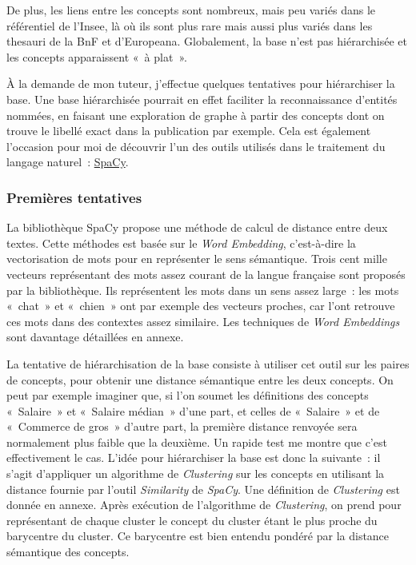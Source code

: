 De plus, les liens entre les concepts sont nombreux, mais peu variés dans le référentiel de l'Insee, là où ils sont plus rare mais aussi plus variés dans les thesauri de la BnF et d'Europeana. Globalement, la base n'est pas hiérarchisée et les concepts apparaissent «~à plat~».
\newline

À la demande de mon tuteur, j'effectue quelques tentatives pour hiérarchiser la base. Une base hiérarchisée pourrait en effet faciliter la reconnaissance d'entités nommées, en faisant une exploration de graphe à partir des concepts dont on trouve le libellé exact dans la publication par exemple. Cela est également l'occasion pour moi de découvrir l'un des outils utilisés dans le traitement du langage naturel~: \href{https://spacy.io/}{SpaCy}.
\label{section 1.2.1}

\subsubsection*{Premières tentatives}
La bibliothèque SpaCy propose une méthode de calcul de distance entre deux textes. Cette méthodes est basée sur le \textit{Word Embedding}, c'est-à-dire la vectorisation de mots pour en représenter le sens sémantique. Trois cent mille vecteurs représentant des mots assez courant de la langue française sont proposés par la bibliothèque. Ils représentent les mots dans un sens assez large~: les mots «~chat~» et «~chien~» ont par exemple des vecteurs proches, car l'ont retrouve ces mots dans des contextes assez similaire. Les techniques de \textit{Word Embeddings} sont davantage détaillées en annexe.
\newline

La tentative de hiérarchisation de la base consiste à utiliser cet outil sur les paires de concepts, pour obtenir une distance sémantique entre les deux concepts. On peut par exemple imaginer que, si l'on soumet les définitions des concepts «~Salaire~» et «~Salaire médian~» d'une part, et celles de «~Salaire~» et de «~Commerce de gros~» d'autre part, la première distance renvoyée sera normalement plus faible que la deuxième. Un rapide test me montre que c'est effectivement le cas. L'idée pour hiérarchiser la base est donc la suivante~: il s'agit d'appliquer un algorithme de \textit{Clustering} sur les concepts en utilisant la distance fournie par l'outil \textit{Similarity} de \textit{SpaCy}. Une définition de \textit{Clustering} est donnée en annexe. Après exécution de l'algorithme de \textit{Clustering}, on prend pour représentant de chaque cluster le concept du cluster étant le plus proche du barycentre du cluster. Ce barycentre est bien entendu pondéré par la distance sémantique des concepts.
\newline

